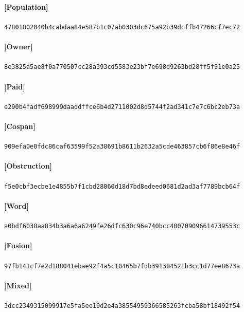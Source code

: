 \documentclass[11pt]{article}
\begin{document}
\paragraph{[Population]} \par
{\small\texttt{47801802040b4cabdaa84e587b1c07ab0303dc675a92b39dcffb47266cf7ec72}}
\paragraph{[Owner]} \par
{\small\texttt{8e3825a5ae8f0a770507cc28a393cd5583e23bf7e698d9263bd28ff5f91e0a25}}
\paragraph{[Paid]} \par
{\small\texttt{e290b4fadf698999daaddffce6b4d2711002d8d5744f2ad341c7e7c6bc2eb73a}}
\paragraph{[Cospan]} \par
{\small\texttt{909efa0e0fdc86caf63599f52a38691b8611b2632a5cde463857cb6f86e8e46f}}
\paragraph{[Obstruction]} \par
{\small\texttt{f5e0cbf3ecbe1e4855b7f1cbd28060d18d7bd8edeed0681d2ad3af7789bcb64f}}
\paragraph{[Word]} \par
{\small\texttt{a0bdf6038aa834b3a6a6a6249fe26dfc630c96e740bcc400709096614739553c}}
\paragraph{[Fusion]} \par
{\small\texttt{97fb141cf7e2d188041ebae92f4a5c10465b7fdb391384521b3cc1d77ee8673a}}
\paragraph{[Mixed]} \par
{\small\texttt{3dcc2349315099917e5fa5ee19d2e4a38554959366585263fcba58bf18492f54}}
\end{document}
